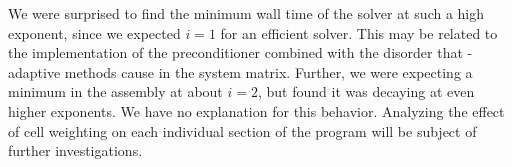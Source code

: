 We were surprised to find the minimum wall time of the solver at such a high exponent, since we expected $i = 1$ for an efficient solver. This may be related to the implementation of the preconditioner combined with the disorder that \hp-adaptive methods cause in the system matrix. Further, we were expecting a minimum in the assembly at about $i = 2$, but found it was decaying at even higher exponents. We have no explanation for this behavior. Analyzing the effect of cell weighting on each individual section of the program
will be subject of further investigations.

